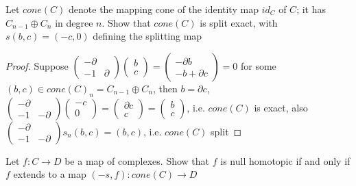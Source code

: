 \documentclass{article}
\newenvironment{exercise}[2][Exercise]{\begin{trivlist}
\item[\hskip \labelsep {\bfseries #1}\hskip \labelsep {\bfseries #2.}]}{\end{trivlist}}
\theoremstyle{definition}
\theoremstyle{remark}
\theoremstyle{definition}
\begin{document}
\begin{exercise}{\textbf{1.5.1}}
Let $cone(C)$ denote the mapping cone of the identity map $id_C$ of $C$; it has $C_{n-1}\oplus C_n$ in degree $n$. Show that $cone(C)$ is split exact, with $s(b,c)=(-c,0)$ defining the splitting map
\end{exercise}

\begin{proof}
Suppose $\begin{pmatrix}
-\partial & \\
-1 & \partial
\end{pmatrix}\begin{pmatrix}
b \\
c
\end{pmatrix}=\begin{pmatrix}
-\partial b \\
-b+\partial c
\end{pmatrix}=0$ for some $(b,c)\in cone(C)_n=C_{n-1}\oplus C_n$, then $b=\partial c$, $\begin{pmatrix}
-\partial & \\
-1 & -\partial
\end{pmatrix}\begin{pmatrix}
-c \\
0
\end{pmatrix}=\begin{pmatrix}
\partial c \\
c
\end{pmatrix}=\begin{pmatrix}
b \\
c
\end{pmatrix}$, i.e. $cone(C)$ is exact, also $\begin{pmatrix}
-\partial & \\
-1 & -\partial
\end{pmatrix}s_n(b,c)=(b,c)$, i.e. $cone(C)$ split
\end{proof}

\begin{exercise}{\textbf{1.5.2}}
Let $f:C\to D$ be a map of complexes. Show that $f$ is null homotopic if and only if $f$ extends to a map $(-s,f):cone(C)\to D$
\end{exercise}
\end{document}

